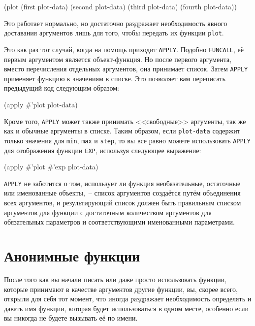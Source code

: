 \begin{myverb}
(plot 
  (first plot-data) 
  (second plot-data) 
  (third plot-data) 
  (fourth plot-data))
\end{myverb}

Это работает нормально, но достаточно раздражает необходимость явного доставания
аргументов лишь для того, чтобы передать их функции \lstinline{plot}.

Это как раз тот случай, когда на помощь приходит \lstinline{APPLY}.  Подобно \lstinline{FUNCALL}, её
первым аргументом является объект-функция.  Но после первого аргумента, вместо
перечисления отдельных аргументов, она принимает список.  Затем \lstinline{APPLY} применяет
функцию к значениям в списке.  Это позволяет вам переписать предыдущий код следующим
образом:

\begin{myverb}
(apply #'plot plot-data)
\end{myverb}

Кроме того, \lstinline{APPLY} может также принимать <<свободные>> аргументы, так же как и обычные
аргументы в списке. Таким образом, если \lstinline{plot-data} содержит только значения для
\lstinline{min}, \lstinline{max} и \lstinline{step}, то вы все равно можете использовать \lstinline{APPLY} для
отображения функции \lstinline{EXP}, используя следующее выражение:

\begin{myverb}
(apply #'plot #'exp plot-data)
\end{myverb}

\lstinline{APPLY} не заботится о том, использует ли функция необязательные, остаточные или
именованные объекты,~-- список аргументов создаётся путём объединения всех аргументов, и
результирующий список должен быть правильным списком аргументов для функции с достаточным
количеством аргументов для обязательных параметров и соответствующими именованными
параметрами.

\section{Анонимные функции}

После того как вы начали писать или даже просто использовать функции, которые принимают в
качестве аргументов другие функции, вы, скорее всего, открыли для себя тот момент, что
иногда раздражает необходимость определять и давать имя функции, которая будет
использоваться в одном месте, особенно если вы никогда не будете вызывать её по имени.

